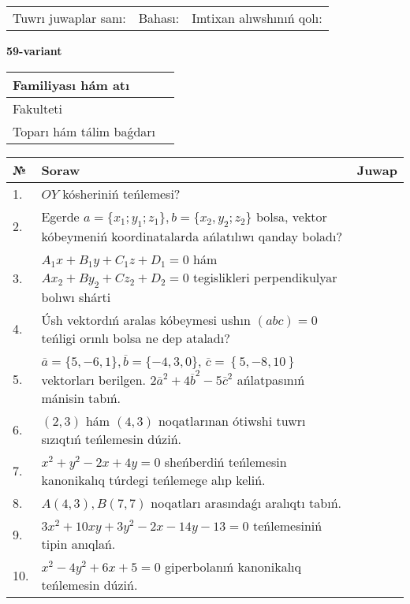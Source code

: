 \documentclass{article}
\begin{document}
\vspace{1cm}

\begin{tabular}{lll}
Tuwrı juwaplar sanı: \underline{\hspace{1.5cm}} & 
Bahası: \underline{\hspace{1.5cm}} & 
Imtixan alıwshınıń qolı: \underline{\hspace{2cm}} \\
\end{tabular}

\egroup

\newpage


\textbf{59-variant}\\

\bgroup
\def\arraystretch{1.6} %

\begin{tabular}{|m{5.7cm}|m{9.5cm}|}
\hline
Familiyası hám atı & \\
\hline
Fakulteti  & \\
\hline
Toparı hám tálim baǵdarı  & \\
\hline
\end{tabular}

\vspace{1cm}

\begin{tabular}{|m{0.7cm}|m{10cm}|m{4cm}|}
\hline
№ & Soraw & Juwap \\
\hline
1. & $OY$ kósheriniń teńlemesi? &  \\
\hline
2. & Egerde $a=\{ x_1; y_1; z_1\}, b=\{ x_2, y_2; z_2\}$ bolsa, vektor kóbeymeniń koordinatalarda ańlatılıwı qanday boladı? &  \\
\hline
3. & $A_1x+B_1y+C_1z+D_1=0$ hám $Ax_2+By_2+Cz_2+D_2=0$ tegislikleri perpendikulyar bolıwı shárti &  \\
\hline
4. & Úsh vektordıń aralas kóbeymesi ushın $(abc)=0$ teńligi orınlı bolsa ne dep ataladı? &  \\
\hline
5. & $\overline{a}=\{5,-6, 1 \}, \overline{b}=\{-4, 3, 0 \} $, $\overline{c}=\left\{ 5,-8, 10 \right\}$ vektorları berilgen. $2{\overline{a}}^{2}+4{\overline{b}}^{2}-5{\overline{c}}^{2}$ ańlatpasınıń mánisin tabıń. &  \\
\hline
6. & $(2, 3)$ hám $(4, 3)$ noqatlarınan ótiwshi tuwrı sızıqtıń teńlemesin dúziń. &  \\
\hline
7. & $x^{2}+y^{2}-2x+4y=0$ sheńberdiń teńlemesin kanonikalıq túrdegi teńlemege alıp keliń. &  \\
\hline
8. & $A(4, 3), B(7, 7)$ noqatları arasındaǵı aralıqtı tabıń. &  \\
\hline
9. & $3x^{2}+10xy+3y^{2}-2x-14y-13=0$ teńlemesiniń tipin anıqlań. &  \\
\hline
10. & $x^{2}-4y^{2}+6x+5=0$ giperbolanıń kanonikalıq teńlemesin dúziń. &  \\
\hline
\end{tabular}
\end{document}
